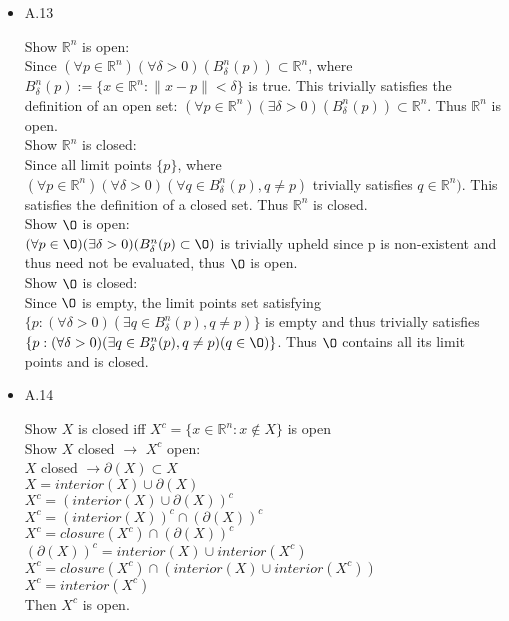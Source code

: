 \documentclass[12pt,letter]{article}
\newcommand{\R}{\mathbb{R}}
\begin{document}


\begin{itemize}
  
\item A.13

  Show $\R^n$ is open:\\
  Since $(\forall p \in \R^n)(\forall \delta>0) (B_{\delta}^n(p)) \subset \R^n$, where $B_{\delta}^n(p) := \{x\in\R^n: \|x-p\| < \delta \}$ is true. This trivially satisfies the definition of an open set:
  $(\forall p \in \R^n)(\exists \delta>0) (B_{\delta}^n(p)) \subset \R^n$. Thus $\R^n$ is open.\\

  Show $\R^n$ is closed:\\
  Since all limit points $\{p\}$, where $(\forall p \in \R^n)(\forall \delta>0) (\forall q \in B_{\delta}^n(p), q \neq p)$ trivially satisfies $q \in \R^n)$. This satisfies the definition of a closed set. Thus $\R^n$ is closed.\\

  Show $\O$ is open:\\
  $(\forall p \in \O)(\exists \delta>0)(B_\delta^n(p) \subset \O)$ is trivially upheld since p is non-existent and thus need not be evaluated, thus $\O$ is open.\\

  Show $\O$ is closed:\\
  Since $\O$ is empty, the limit points set satisfying $\{p: (\forall \delta>0)(\exists q \in B_\delta^n(p), q \neq p)\}$ is empty and thus trivially satisfies $\{p: (\forall \delta>0)(\exists q \in B_\delta^n(p), q \neq p)(q \in \O)\}$. Thus $\O$ contains all its limit points and is closed.

\item A.14
  
  Show $X$ is closed iff $X^c=\{x\in\R^n: x \notin X\}$ is open\\

  Show $X$ closed $\rightarrow$ $X^c$ open:\\
  $X$ closed $\rightarrow \partial(X) \subset X$\\
  $X=interior(X) \cup \partial(X)$\\
  $X^c=(interior(X) \cup \partial(X))^c$\\
  $X^c=(interior(X))^c \cap (\partial(X))^c$\\
  $X^c=closure(X^c) \cap (\partial(X))^c$\\
  $(\partial(X))^c = interior(X) \cup interior(X^c)$\\
  $X^c=closure(X^c) \cap (interior(X) \cup interior(X^c))$\\
  $X^c=interior(X^c)$\\
  Then $X^c$ is open.\\
  \\


\end{itemize}
\end{document}
